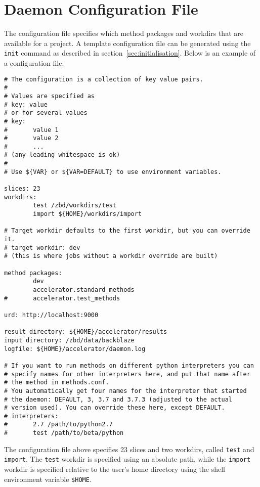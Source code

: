 \section{Daemon Configuration File}
\label{sec:configfile}
The configuration file specifies which method packages and workdirs
that are available for a project.  A template configuration file can
be generated using the \texttt{init} command as described in
section~\ref{sec:initialisation}.  Below is an example of a configuration file.
\begin{snugshade}
\begin{verbatim}
# The configuration is a collection of key value pairs.
#
# Values are specified as
# key: value
# or for several values
# key:
#       value 1
#       value 2
#       ...
# (any leading whitespace is ok)
#
# Use ${VAR} or ${VAR=DEFAULT} to use environment variables.

slices: 23
workdirs:
        test /zbd/workdirs/test
        import ${HOME}/workdirs/import

# Target workdir defaults to the first workdir, but you can override it.
# target workdir: dev
# (this is where jobs without a workdir override are built)

method packages:
        dev
        accelerator.standard_methods
#       accelerator.test_methods   

urd: http://localhost:9000

result directory: ${HOME}/accelerator/results
input directory: /zbd/data/backblaze
logfile: ${HOME}/accelerator/daemon.log

# If you want to run methods on different python interpreters you can
# specify names for other interpreters here, and put that name after
# the method in methods.conf.
# You automatically get four names for the interpreter that started
# the daemon: DEFAULT, 3, 3.7 and 3.7.3 (adjusted to the actual
# version used). You can override these here, except DEFAULT.
# interpreters:
#       2.7 /path/to/python2.7
#       test /path/to/beta/python  
\end{verbatim}
\end{snugshade}%

The configuration file above specifies 23 slices and two workdirs,
called \texttt{test} and \texttt{import}.  The \texttt{test} workdir
is specified using an absolute path, while the \texttt{import} workdir
is specified relative to the user's home directory using the shell
environment variable \texttt{\$HOME}.


